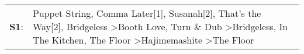 \begin{supertabular}{p{0.03\textwidth}p{0.92\textwidth}}
 \textbf{S1}:  &  Puppet String\textsuperscript{}, \enspace Comma Later[1]\textsuperscript{}, \enspace Susanah[2]\textsuperscript{}, \enspace That's the Way[2]\textsuperscript{}, \enspace Bridgeless\textsuperscript{} \textgreater \enspace Booth Love\textsuperscript{}, \enspace Turn \& Dub\textsuperscript{} \textgreater \enspace Bridgeless\textsuperscript{}, \enspace In The Kitchen\textsuperscript{}, \enspace The Floor\textsuperscript{} \textgreater \enspace Hajimemashite\textsuperscript{} \textgreater \enspace The Floor\textsuperscript{}  \enspace  \\
\end{supertabular}

